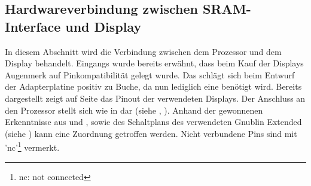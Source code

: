 \newpage
\subsection{Hardwareverbindung zwischen SRAM-Interface und Display}
In diesem Abschnitt wird die Verbindung zwischen dem Prozessor und dem Display behandelt. Eingangs wurde bereits erwähnt, dass beim Kauf der Displays Augenmerk auf Pinkompatibilität gelegt wurde. Das schlägt sich beim Entwurf der Adapterplatine positiv zu Buche, da nun lediglich eine benötigt wird. \newline
Bereits dargestellt zeigt  auf Seite \pageref{fig:8080_pinout} das Pinout der verwendeten Displays. Der Anschluss an den Prozessor stellt sich wie in  dar (siehe \cite{Coldtears2014}, \cite{EmbeddedProjects2013}). Anhand der gewonnenen Erkenntnisse aus  und , sowie des Schaltplans des verwendeten Gnublin Extended (siehe \cite{EmbeddedProjects2013}) kann eine Zuordnung getroffen werden. Nicht verbundene Pins sind mit 'nc'\footnote{nc: not connected} vermerkt.

